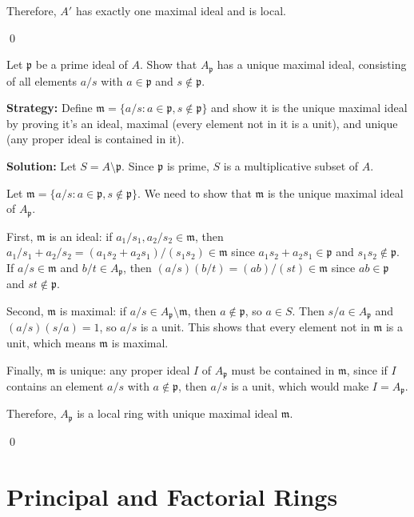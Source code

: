 Therefore, $A'$ has exactly one maximal ideal and is local.


\qed
\begin{problembox}
Let $\mathfrak{p}$ be a prime ideal of $A$. Show that $A_{\mathfrak{p}}$ has a unique maximal ideal, consisting of all elements $a/s$ with $a \in \mathfrak{p}$ and $s \notin \mathfrak{p}$.
\end{problembox}

\noindent\textbf{Strategy:} Define $\mathfrak{m} = \{a/s : a \in \mathfrak{p}, s \notin \mathfrak{p}\}$ and show it is the unique maximal ideal by proving it's an ideal, maximal (every element not in it is a unit), and unique (any proper ideal is contained in it).

\noindent\textbf{Solution:}
Let $S = A \setminus \mathfrak{p}$. Since $\mathfrak{p}$ is prime, $S$ is a multiplicative subset of $A$.

Let $\mathfrak{m} = \{a/s : a \in \mathfrak{p}, s \notin \mathfrak{p}\}$. We need to show that $\mathfrak{m}$ is the unique maximal ideal of $A_{\mathfrak{p}}$.

First, $\mathfrak{m}$ is an ideal: if $a_1/s_1, a_2/s_2 \in \mathfrak{m}$, then $a_1/s_1 + a_2/s_2 = (a_1s_2 + a_2s_1)/(s_1s_2) \in \mathfrak{m}$ since $a_1s_2 + a_2s_1 \in \mathfrak{p}$ and $s_1s_2 \notin \mathfrak{p}$. If $a/s \in \mathfrak{m}$ and $b/t \in A_{\mathfrak{p}}$, then $(a/s)(b/t) = (ab)/(st) \in \mathfrak{m}$ since $ab \in \mathfrak{p}$ and $st \notin \mathfrak{p}$.

Second, $\mathfrak{m}$ is maximal: if $a/s \in A_{\mathfrak{p}} \setminus \mathfrak{m}$, then $a \notin \mathfrak{p}$, so $a \in S$. Then $s/a \in A_{\mathfrak{p}}$ and $(a/s)(s/a) = 1$, so $a/s$ is a unit. This shows that every element not in $\mathfrak{m}$ is a unit, which means $\mathfrak{m}$ is maximal.

Finally, $\mathfrak{m}$ is unique: any proper ideal $I$ of $A_{\mathfrak{p}}$ must be contained in $\mathfrak{m}$, since if $I$ contains an element $a/s$ with $a \notin \mathfrak{p}$, then $a/s$ is a unit, which would make $I = A_{\mathfrak{p}}$.

Therefore, $A_{\mathfrak{p}}$ is a local ring with unique maximal ideal $\mathfrak{m}$.


\qed
\section{Principal and Factorial Rings}

